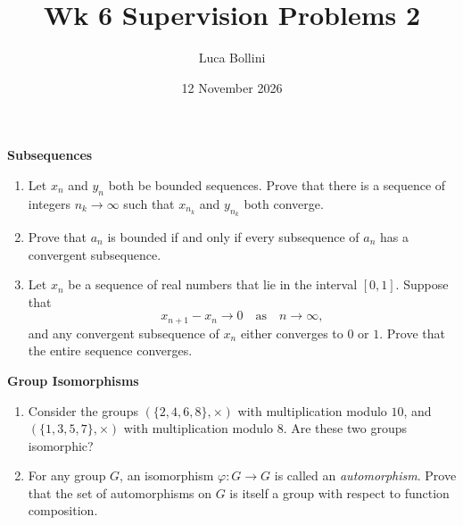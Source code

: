 \documentclass{article}
\title{Wk 6 Supervision Problems 2}
\author{Luca Bollini}
\date{12 November 2026}
\begin{document}
\maketitle

\begin{center}
\huge{\textbf{Subsequences}}
\end{center}

\begin{enumerate}
    \item Let $x_n$ and $y_n$ both be bounded sequences. Prove that there is a sequence of integers $n_k\to\infty$ such that $x_{n_k}$ and $y_{n_k}$ both converge.
    \item Prove that $a_n$ is bounded if and only if every subsequence of $a_n$ has a convergent subsequence.
    \item Let $x_n$ be a sequence of real numbers that lie in the interval $[0,1]$. Suppose that
    \[
    x_{n+1}-x_n\to 0 \quad \text{as}\quad n\to \infty,
    \]
    and any convergent subsequence of $x_n$ either converges to $0$ or $1$. Prove that the entire sequence converges.
\end{enumerate}

\begin{center}
\huge{\textbf{Group Isomorphisms}}
\end{center}

\begin{enumerate}
    \item Consider the groups $(\{2,4,6,8\}, \times)$ with multiplication modulo $10$, and $(\{1,3,5,7\}, \times)$ with multiplication modulo $8$. Are these two groups isomorphic?
    \item For any group $G$, an isomorphism $\varphi:G\to G$ is called an \emph{automorphism}. Prove that the set of automorphisms on $G$ is itself a group with respect to function composition.
\end{enumerate}
\end{document}
